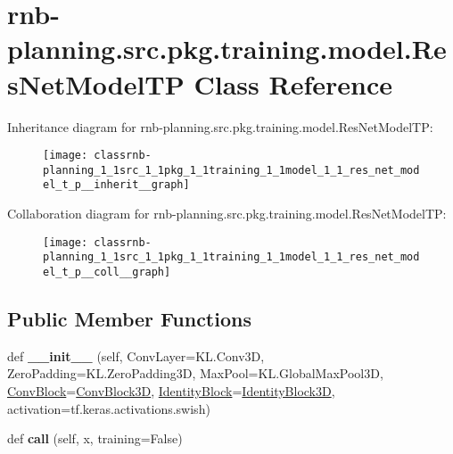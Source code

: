 \hypertarget{classrnb-planning_1_1src_1_1pkg_1_1training_1_1model_1_1_res_net_model_t_p}{}\section{rnb-\/planning.src.\+pkg.\+training.\+model.\+Res\+Net\+Model\+TP Class Reference}
\label{classrnb-planning_1_1src_1_1pkg_1_1training_1_1model_1_1_res_net_model_t_p}


Inheritance diagram for rnb-\/planning.src.\+pkg.\+training.\+model.\+Res\+Net\+Model\+TP\+:\nopagebreak
\begin{figure}[H]
\begin{center}
\leavevmode
\texttt{[image: classrnb-planning\_1\_1src\_1\_1pkg\_1\_1training\_1\_1model\_1\_1\_res\_net\_model\_t\_p\_\_inherit\_\_graph]}
\end{center}
\end{figure}


Collaboration diagram for rnb-\/planning.src.\+pkg.\+training.\+model.\+Res\+Net\+Model\+TP\+:\nopagebreak
\begin{figure}[H]
\begin{center}
\leavevmode
\texttt{[image: classrnb-planning\_1\_1src\_1\_1pkg\_1\_1training\_1\_1model\_1\_1\_res\_net\_model\_t\_p\_\_coll\_\_graph]}
\end{center}
\end{figure}
\subsection*{Public Member Functions}
\begin{DoxyCompactItemize}
\item 
\mbox{\label{classrnb-planning_1_1src_1_1pkg_1_1training_1_1model_1_1_res_net_model_t_p_a9ae67038a77aa80d924b7b2e25b46627}} 
def {\bfseries \+\_\+\+\_\+init\+\_\+\+\_\+} (self, Conv\+Layer=K\+L.\+Conv3D, Zero\+Padding=K\+L.\+Zero\+Padding3D, Max\+Pool=K\+L.\+Global\+Max\+Pool3D, \hyperlink{classrnb-planning_1_1src_1_1pkg_1_1training_1_1model_1_1_conv_block}{Conv\+Block}=\hyperlink{classrnb-planning_1_1src_1_1pkg_1_1training_1_1model_1_1_conv_block3_d}{Conv\+Block3D}, \hyperlink{classrnb-planning_1_1src_1_1pkg_1_1training_1_1model_1_1_identity_block}{Identity\+Block}=\hyperlink{classrnb-planning_1_1src_1_1pkg_1_1training_1_1model_1_1_identity_block3_d}{Identity\+Block3D}, activation=tf.\+keras.\+activations.\+swish)
\item 
\mbox{\label{classrnb-planning_1_1src_1_1pkg_1_1training_1_1model_1_1_res_net_model_t_p_aff7267d9cb0ba4111538a4cba32f4eb6}} 
def {\bfseries call} (self, x, training=False)
\end{DoxyCompactItemize}
